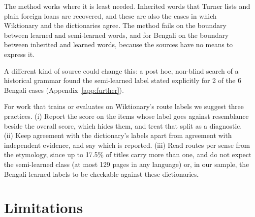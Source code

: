 \documentclass[11pt]{article}
\begin{document}
The method works where it is least needed. Inherited words that Turner lists and plain foreign loans are recovered, and these are also the cases in which Wiktionary and the dictionaries agree. The method fails on the boundary between learned and semi-learned words, and for Bengali on the boundary between inherited and learned words, because the sources have no means to express it.

A different kind of source could change this: a post hoc, non-blind search of a historical grammar found the semi-learned label stated explicitly for 2 of the 6 Bengali cases (Appendix~\ref{app:further}).

For work that trains or evaluates on Wiktionary's route labels we suggest three practices. (i) Report the score on the items whose label goes against resemblance beside the overall score, which hides them, and treat that split as a diagnostic. (ii) Keep agreement with the dictionary's labels apart from agreement with independent evidence, and say which is reported. (iii) Read routes per sense from the etymology, since up to 17.5\% of titles carry more than one, and do not expect the semi-learned class (at most 129 pages in any language) or, in our sample, the Bengali learned labels to be checkable against these dictionaries.

\section*{Limitations}
\end{document}
